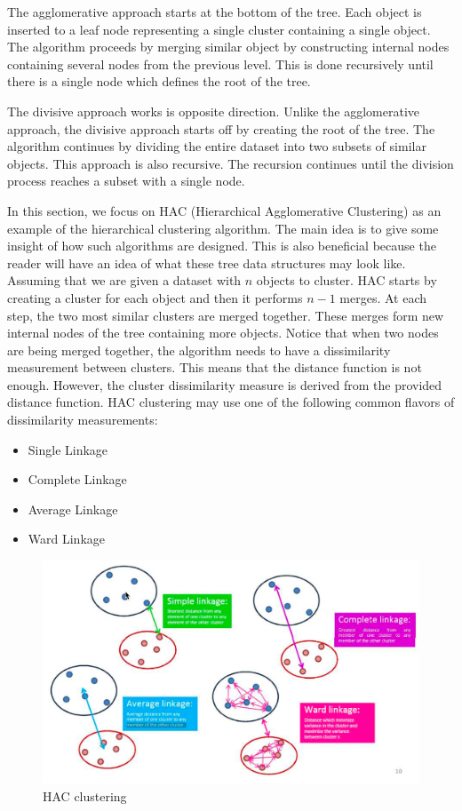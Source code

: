 \documentclass[a4paper, 12pt]{article}
\begin{document}
The agglomerative approach starts at the bottom of the tree. Each object is inserted to a leaf node representing a single cluster containing a single object. The algorithm proceeds by merging similar object by constructing internal nodes containing several nodes from the previous level. This is done recursively until there is a single node which defines the root of the tree.

The divisive approach works is opposite direction. Unlike the agglomerative approach, the divisive approach starts off by creating the root of the tree. The algorithm continues by dividing the entire dataset into two subsets of similar objects. This approach is also recursive. The recursion continues until the division process reaches a subset with a single node. 

In this section, we focus on HAC (Hierarchical Agglomerative Clustering) as an example of the hierarchical clustering algorithm. The main idea is to give some insight of how such algorithms are designed. This is also beneficial because the reader will have an idea of what these tree data structures may look like. Assuming that we are given a dataset with $n$ objects to cluster. HAC starts by creating a cluster for each object and then it performs $n - 1$ merges. At each step, the two most similar clusters are merged together. These merges form new internal nodes of the tree containing more objects. Notice that when two nodes are being merged together, the algorithm needs to have a dissimilarity measurement between clusters. This means that the distance function is not enough. However, the cluster dissimilarity measure is derived from the provided distance function. HAC clustering may use one of the following common flavors of dissimilarity measurements:
\begin{itemize}
    \item Single Linkage
    \item Complete Linkage
    \item Average Linkage
    \item Ward Linkage
\end{itemize}

\begin{figure}[ht]
    \centering
    \includegraphics[width=1\textwidth]{HAC Clustering.png}
    \caption{HAC clustering \citep{hierarchicaltutorial2017}}
\end{figure}
\end{document}
